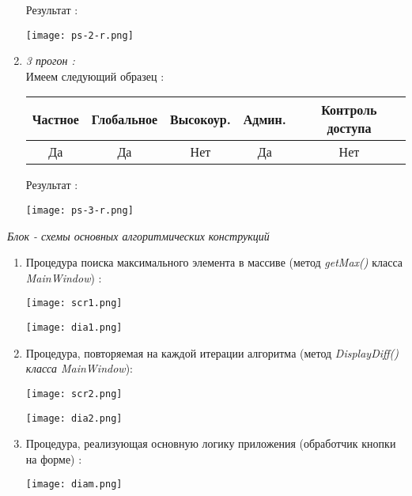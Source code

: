 \documentclass[a4paper,12pt]{article}
\begin{document}
\begin{flushleft}
\begin{enumerate}
				Результат :
				\begin{center}
					\texttt{[image: ps-2-r.png]}
				\end{center}
				\item \textit{3 прогон :}
				\\
				\medskip Имеем следующий образец :
				\begin{center}
				\begin{tabular}{|c|c|c|c|c|}
					\hline \textbf{Частное} & \textbf{Глобальное} & \textbf{Высокоур.} & \textbf{Админ.} & \textbf{Контроль 	доступа} \\ 
					\hline Да  & Да & Нет  & Да & Нет \\ 
					\hline 
				\end{tabular} 
				\end{center}																			Результат :
				\begin{center}
					\texttt{[image: ps-3-r.png]}
				\end{center}				
			\end{enumerate}
			\newpage
			\begin{flushleft}
		\begin{center}
\textit{Блок - схемы основных алгоритмических конструкций}
\end{center}
				\begin{enumerate}
					\item Процедура поиска максимального элемента в массиве (метод \textit{getMax()} класса \textit{MainWindow}) :
					\begin{center}
						\texttt{[image: scr1.png]}
					\end{center}
					\medskip
					\begin{center}
						\texttt{[image: dia1.png]}
					\end{center}
					\newpage
					\item Процедура, повторяемая на каждой итерации алгоритма (метод \textit{DisplayDiff()} \textit{класса MainWindow}):
					\begin{center}
						\texttt{[image: scr2.png]}
					\end{center}
					\begin{center}
						\texttt{[image: dia2.png]}
					\end{center}
					\newpage
					\item Процедура, реализующая основную логику приложения (обработчик кнопки на форме) :
					\begin{center}
						\texttt{[image: diam.png]}
					\end{center}					
															 
				\end{enumerate}
			\end{flushleft}				
	\end{flushleft}		
\end{document}
